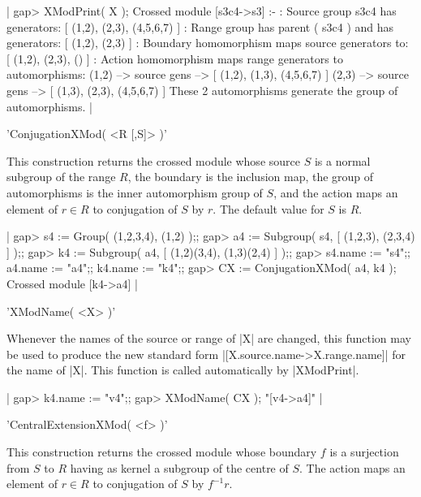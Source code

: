|    gap> XModPrint( X );
    Crossed module [s3c4->s3] :- 
    : Source group s3c4 has generators:
      [ (1,2), (2,3), (4,5,6,7) ]
    : Range group has parent ( s3c4 ) and has generators:
      [ (1,2), (2,3) ]
    : Boundary homomorphism maps source generators to:
      [ (1,2), (2,3), () ]
    : Action homomorphism maps range generators to automorphisms:
      (1,2) --> { source gens --> [ (1,2), (1,3), (4,5,6,7) ] }
      (2,3) --> { source gens --> [ (1,3), (2,3), (4,5,6,7) ] }
      These 2 automorphisms generate the group of automorphisms.   |

%

'ConjugationXMod( <R [,S]> )'

This construction returns the  crossed module  whose  source $S$ is  a
normal subgroup of  the range $R$, the  boundary is the inclusion map,
the group of automorphisms is the inner automorphism group of $S$, and
the action maps an element of $r \in R$  to conjugation of $S$ by $r$.
The default value for $S$ is $R$.

|    gap> s4 := Group( (1,2,3,4), (1,2) );;
    gap> a4 := Subgroup( s4, [ (1,2,3), (2,3,4) ] );;
    gap> k4 := Subgroup( a4, [ (1,2)(3,4), (1,3)(2,4) ] );;
    gap> s4.name := "s4";;  a4.name := "a4";;  k4.name := "k4";;
    gap> CX := ConjugationXMod( a4, k4 );
    Crossed module [k4->a4] |

%

'XModName( <X> )'

Whenever  the names of the  source or range of  |X|  are changed, this
function may     be   used  to produce      the  new   standard   form
|[X.source.name->X.range.name]| for the name of |X|.  This function is
called automatically by |XModPrint|.

|    gap> k4.name := "v4";;
    gap> XModName( CX );
    "[v4->a4]"           |

%

'CentralExtensionXMod( <f> )'

This  construction returns the crossed module  whose boundary $f$ is a
surjection from $S$  to $R$ having as kernel  a subgroup of the centre
of $S$.  The action maps an element of $r \in R$ to conjugation of $S$
by $f^{-1}r$.

